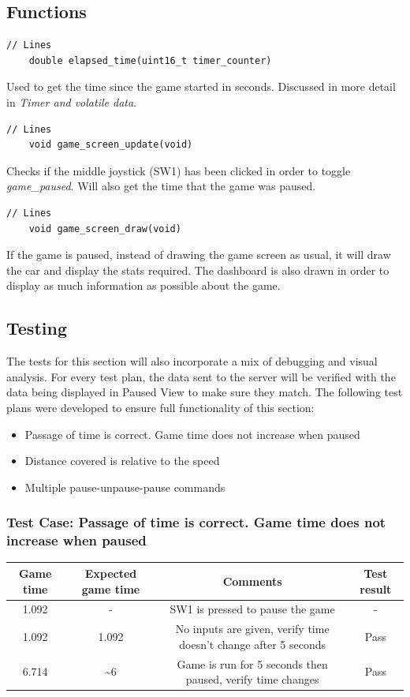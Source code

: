 \documentclass{article}
\begin{document}
\subsection*{Functions}
\begin{lstlisting}[style=CStyle]
	// Lines
	double elapsed_time(uint16_t timer_counter)
\end{lstlisting}
Used to get the time since the game started in seconds. Discussed in more detail in \emph{Timer and volatile data}.
\begin{lstlisting}[style=CStyle]
	// Lines
	void game_screen_update(void)
\end{lstlisting}
Checks if the middle joystick (SW1) has been clicked in order to toggle \emph{game\_paused}. Will also get the time that the game was paused.
\begin{lstlisting}[style=CStyle]
	// Lines
	void game_screen_draw(void)
\end{lstlisting}
If the game is paused, instead of drawing the game screen as usual, it will draw the car and display the stats required. The dashboard is also drawn in order to display as much information as possible about the game.
\newpage

\subsection*{Testing}
The tests for this section will also incorporate a mix of debugging and visual analysis. For every test plan, the data sent to the server will be verified with the data being displayed in Paused View to make sure they match. The following test plans were developed to ensure full functionality of this section: 
\begin{itemize}
	\item Passage of time is correct. Game time does not increase when paused
	\item Distance covered is relative to the speed 
	\item Multiple pause-unpause-pause commands
\end{itemize}
\subsubsection*{Test Case: Passage of time is correct. Game time does not increase when paused}
\begin{center}
\begin{tabular}{ c c c c }
Game time	& Expected game time	& Comments									& Test result	\\ \hline
1.092		& - 				& SW1 is pressed to pause the game					& - 		\\
1.092		& 1.092			& No inputs are given, verify time doesn't change after 5 seconds  & Pass	\\
6.714		& \textasciitilde 6		& Game is run for 5 seconds then paused, verify time changes	& Pass	\\ \hline
\end{tabular}
\end{center}
\end{document}
